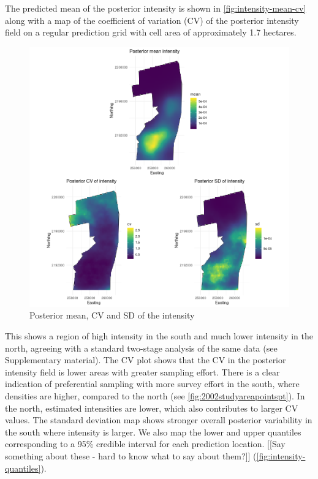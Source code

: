 \documentclass[preprint,12pt]{elsarticle}
\begin{document}
The predicted mean of the posterior intensity is shown in \autoref{fig:intensity-mean-cv} along with a map of the coefficient of variation (CV) of the posterior intensity field on a regular prediction grid with cell area of approximately 1.7 hectares.  
\begin{figure}[h]
	\begin{center}
		\includegraphics[scale=0.4]{figures/intensity_mean_cv_sd.png}
		\caption{Posterior mean, CV and SD of the intensity}
		\label{fig:intensity-mean-cv}
	\end{center}
\end{figure}
This shows a region of high intensity in the south and much lower intensity in the north, agreeing with a standard two-stage analysis of the same data (see Supplementary material).  The CV plot shows that the CV in the posterior intensity field is lower areas with greater sampling effort.  There is a clear indication of preferential sampling with more survey effort in the south, where densities are higher, compared to the north  (see \autoref{fig:2002studyareapointspt}).  In the north, estimated intensities are lower, which also contributes to larger CV values.  The standard deviation map shows stronger overall posterior variability in the south where intensity is larger.  We also map the lower and upper quantiles corresponding to a 95\% credible interval for each prediction location.  [[Say something about these - hard to know what to say about them?]]   (\autoref{fig:intensity-quantiles}).
\end{document}

